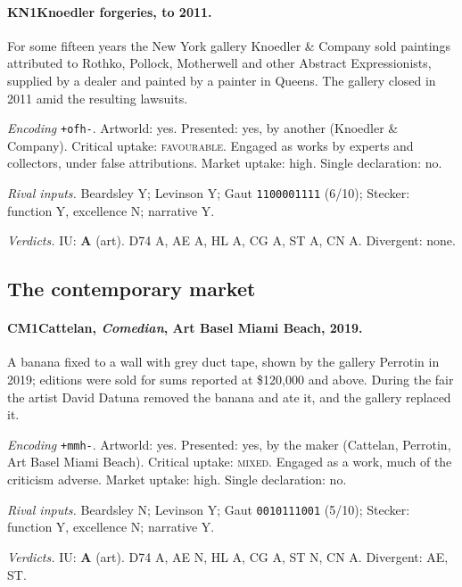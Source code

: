 \paragraph{KN1\enspace Knoedler forgeries, to 2011.}
For some fifteen years the New York gallery Knoedler \& Company sold paintings attributed to Rothko, Pollock, Motherwell and other Abstract Expressionists, supplied by a dealer and painted by a painter in Queens. The gallery closed in 2011 amid the resulting lawsuits.\par
\noindent\textit{Encoding} \texttt{+ofh-}. Artworld: yes. Presented: yes, by another (Knoedler \& Company). Critical uptake: \textsc{favourable}. Engaged as works by experts and collectors, under false attributions. Market uptake: high. Single declaration: no.\par
\noindent\textit{Rival inputs.} Beardsley Y; Levinson Y; Gaut \texttt{1100001111} (6/10); Stecker: function Y, excellence N; narrative Y.\par
\noindent\textit{Verdicts.} IU: \textbf{A} (art). D74 A, AE A, HL A, CG A, ST A, CN A. Divergent: none.\par

\subsection{The contemporary market}

\paragraph{CM1\enspace Cattelan, \emph{Comedian}, Art Basel Miami Beach, 2019.}
A banana fixed to a wall with grey duct tape, shown by the gallery Perrotin in 2019; editions were sold for sums reported at \$120{,}000 and above. During the fair the artist David Datuna removed the banana and ate it, and the gallery replaced it.\par
\noindent\textit{Encoding} \texttt{+mmh-}. Artworld: yes. Presented: yes, by the maker (Cattelan, Perrotin, Art Basel Miami Beach). Critical uptake: \textsc{mixed}. Engaged as a work, much of the criticism adverse. Market uptake: high. Single declaration: no.\par
\noindent\textit{Rival inputs.} Beardsley N; Levinson Y; Gaut \texttt{0010111001} (5/10); Stecker: function Y, excellence N; narrative Y.\par
\noindent\textit{Verdicts.} IU: \textbf{A} (art). D74 A, AE N, HL A, CG A, ST N, CN A. Divergent: AE, ST.\par


